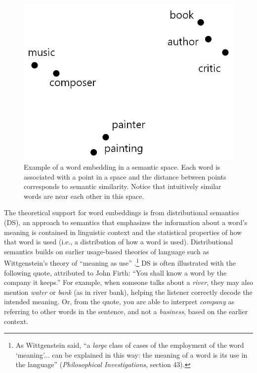 \begin{figure}[h]
    \centering
    \includegraphics[scale=.3]{./images/Word_vector_demo.png}
    \caption[Adapted from an image generated using \url{http://vectors.nlpl.eu/explore/embeddings/en/}.]{Example of a word embedding in a semantic space. Each word is associated with a point in a space and the distance between points corresponds to semantic similarity. Notice that intuitively similar words are near each other in this space. }
 \label{f:writerPainterExample}
\end{figure}

The theoretical support for word embeddings is from distributional semantics (DS), an approach to semantics that emphasizes the information about a word's meaning is contained in linguistic context \cite{harris1954distributional, firth1957synopsis} and the statistical properties of how that word is used (i.e., a distribution of how a word is used). Distributional semantics builds on earlier usage-based theories of language such as Wittgenstein's theory of ``meaning as use'' \cite{wittgenstein1953philosophical}.\footnote{As Wittgenstein said, ``a \emph{large} class of cases of the employment of the word `meaning'... can be explained in this way: the meaning of a word is its use in the language'' (\emph{Philosophical Investigations}, section 43).} DS is often illustrated with the following quote, attributed to John Firth: ``You shall know a word by the company it keeps.'' For example, when someone talks about a \textit{river}, they may also mention \textit{water} or \textit{bank} (as in river bank), helping the listener correctly decode the intended meaning. Or, from the quote, you are able to interpret \textit{company} as referring to other words in the sentence, and not a \textit{business}, based on the earlier context.

